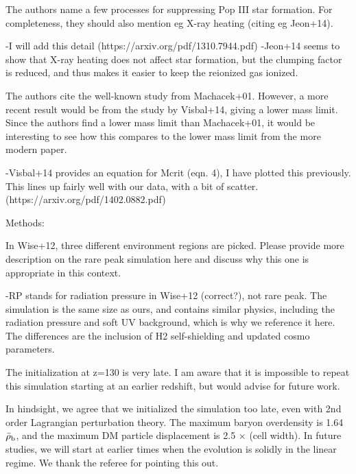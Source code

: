 \documentclass[11pt]{article}
\newenvironment{referee}[1][]{%
    \ignorespaces%
    \begin{mdframed}[style=myquotestyle,#1]%
}{%
    \end{mdframed}%
    \ignorespacesafterend%
}%
\begin{document}
\begin{referee}
The authors name a few processes for suppressing Pop III star formation. For completeness, they should also mention eg X-ray heating (citing eg Jeon+14).
\end{referee}
-I will add this detail (https://arxiv.org/pdf/1310.7944.pdf)
-Jeon+14 seems to show that X-ray heating does not affect star formation, but 
the clumping factor is reduced, and thus makes it easier to keep the reionized 
gas ionized. 

\begin{referee}
The authors cite the well-known study from Machacek+01. However, a more recent result would be from the study by Visbal+14, giving a lower mass limit. Since the authors find a lower mass limit than Machacek+01, it would be interesting to see how this compares to the lower mass limit from the more modern paper.
\end{referee}
-Visbal+14 provides an equation for Mcrit (eqn. 4), I have plotted this previously. This lines up fairly well with our data, with a bit of scatter.  (https://arxiv.org/pdf/1402.0882.pdf) 

\begin{referee}
Methods:

In Wise+12, three different environment regions are picked. Please provide more description on the rare peak simulation here and discuss why this one is appropriate in this context.
\end{referee}
-RP stands for radiation pressure in Wise+12 (correct?), not rare peak. The simulation is the same size as ours, and contains similar physics, including the radiation pressure and soft UV background, which is why we reference it here. The differences are the inclusion of H2 self-shielding and updated cosmo parameters.
 
\begin{referee}
The initialization at z=130 is very late. I am aware that it is impossible to repeat this simulation starting at an earlier redshift, but would advise for future work.
\end{referee}

In hindsight, we agree that we initialized the simulation too late, even with 2nd order Lagrangian perturbation theory.  The maximum baryon overdensity is 1.64$\bar{\rho}_{\rm b}$, and the maximum DM particle displacement is 2.5 $\times$ (cell width).  In future studies, we will start at earlier times when the evolution is solidly in the linear regime.  We thank the referee for pointing this out.
\end{document}
